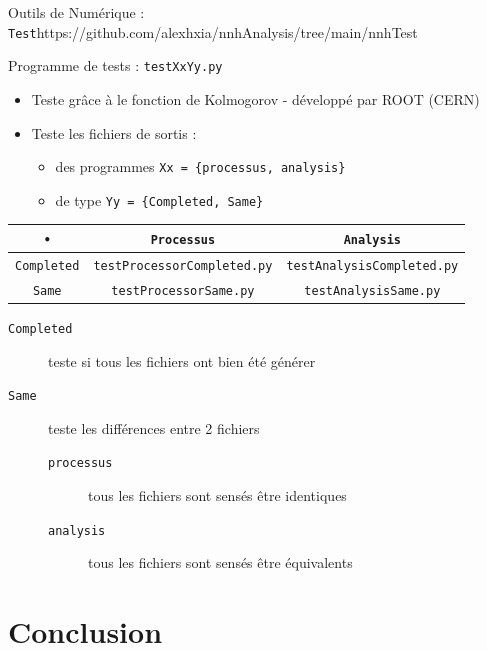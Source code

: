 \documentclass[9pt]{beamer}
\begin{document}
\begin{frame}{Outils de Numérique : \texttt{Test}}{https://github.com/alexhxia/nnhAnalysis/tree/main/nnhTest}

\begin{block}{Programme de tests : \texttt{testXxYy.py}}
	\begin{itemize}
		\item Teste grâce à le fonction de Kolmogorov - développé par ROOT (CERN)
		\item Teste les fichiers de sortis :
		\begin{itemize}
			\item des programmes \texttt{Xx = \{processus, analysis\}}
			\item de type \texttt{Yy = \{Completed, Same\}}
		\end{itemize}
	\end{itemize}
	\begin{tabular}{| c | c | c |}
		\hline
			\texttt{•} & \texttt{Processus} & \texttt{Analysis} \\
		\hline
			\texttt{Completed} & \texttt{testProcessorCompleted.py} & \texttt{testAnalysisCompleted.py} \\
		\hline
			\texttt{Same} & \texttt{testProcessorSame.py} & \texttt{testAnalysisSame.py} \\
		\hline
	\end{tabular}
	\begin{description}
		\item[\texttt{Completed}] teste si tous les fichiers ont bien été générer
		\item[\texttt{Same}]	teste les différences entre 2 fichiers
		\begin{description}
			\item[\texttt{processus}] tous les fichiers sont sensés être identiques
			\item[\texttt{analysis}]	tous les fichiers sont sensés être équivalents
		\end{description}
	\end{description}
\end{block}

\end{frame}

\section{Conclusion}
\end{document}
